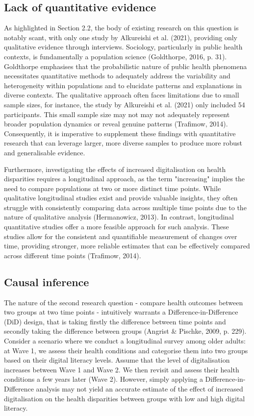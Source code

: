 \subsection{Lack of quantitative evidence}
As highlighted in Section 2.2, the body of existing research on this question is notably scant, with only one study by Alkureishi et al. (2021), providing only qualitative evidence through interviews. Sociology, particularly in public health contexts, is fundamentally a population science (Goldthorpe, 2016, p. 31). Goldthorpe emphasises that the probabilistic nature of public health phenomena necessitates quantitative methods to adequately address the variability and heterogeneity within populations and to elucidate patterns and explanations in diverse contexts. The qualitative approach often faces limitations due to small sample sizes, for instance, the study by Alkureishi et al. (2021) only included 54 participants. This small sample size may not may not adequately represent broader population dynamics or reveal genuine patterns (Trafimow, 2014). Consequently, it is imperative to supplement these findings with quantitative research that can leverage larger, more diverse samples to produce more robust and generalisable evidence.

Furthermore, investigating the effects of increased digitalisation on health disparities requires a longitudinal approach, as the term "increasing" implies the need to compare populations at two or more distinct time points. While qualitative longitudinal studies exist and provide valuable insights, they often struggle with consistently comparing data across multiple time points due to the nature of qualitative analysis (Hermanowicz, 2013). In contrast, longitudinal quantitative studies offer a more feasible approach for such analysis. These studies allow for the consistent and quantifiable measurement of changes over time, providing stronger, more reliable estimates that can be effectively compared across different time points (Trafimow, 2014). 

\subsection{Causal inference}
The nature of the second research question - compare health outcomes between two groups at two time points - intuitively warrants a Difference-in-Difference (DiD) design, that is taking firstly the difference between time points and secondly taking the difference between groups (Angrist \& Pischke, 2009, p. 229). Consider a scenario where we conduct a longitudinal survey among older adults: at Wave 1, we assess their health conditions and categorise them into two groups based on their digital literacy levels. Assume that the level of digitalisation increases between Wave 1 and Wave 2. We then revisit and assess their health conditions a few years later (Wave 2). However, simply applying a Difference-in-Difference analysis may not yield an accurate estimate of the effect of increased digitalisation on the health disparities between groups with low and high digital literacy.

